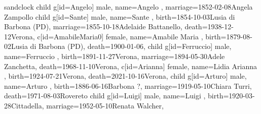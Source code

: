 \documentclass{article}
\begin{document}
\begin{midpage}
\begin{center}

\begin{genealogypicture}[
    processing=database,
    database format=full,
    node size=3.8cm,
    level size=2.8cm,
    level distance=6mm,
    list separators hang=3mm,
    name font=\bfseries,
    surn code={\textcolor{black!50!black}{#1}},
    place text={\newline}{},
    date format=d month yyyy,
    tcbset={male/.style={colframe=blue,colback=blue!5},
    female/.style={colframe=red,colback=red!5}},
    box={fit basedim=7pt,boxsep=2pt,segmentation style=solid,
        halign=left,before upper=\parskip1pt,
        \gtrDBsex,
    },
]
sandclock
{
    child{
        g[id=Angelo]{
            male,
            name={Angelo },
            marriage={1852-02-08}{Angela Zampollo}
        }
        child{
            g[id=Sante]{
                male,
                name={Sante },
                birth={1854-10-03}{Lusia di Barbona (PD)},
                marriage={1855-10-18}{Adelaide Battanello},
                death={1938-12-12}{Verona},
            }
            c[id=AmabileMaria0]{
                female,
                name={Amabile Maria },
                birth={1879-08-02}{Lusia di Barbona (PD)},
                death={1900-01-06}{},
            }
            child{
                g[id=Ferruccio]{
                    male,
                    name={Ferruccio },
                    birth={1891-11-27}{Verona},
                    marriage={1894-05-30}{Adele Zanchetta},
                    death={1968-11-10}{Verona},
                }
                c[id=Arianna]{
                    female,
                    name={Lidia Arianna },
                    birth={1924-07-21}{Verona},
                    death={2021-10-16}{Verona},
                }
            }
            child{
                g[id=Arturo]{
                    male,
                    name={Arturo },
                    birth={1886-06-16}{Barbona ?},
                    marriage={1919-05-10}{Chiara Turri},
                    death={1971-08-03}{Rovereto}
                }
                child{
                    g[id=Luigi]{
                        male,
                        name={Luigi },
                        birth={1920-03-28}{Cittadella},
                        marriage={1952-05-10}{Renata Walcher},
}}}}}}
\end{genealogypicture}
\end{center}
\end{midpage}
\end{document}
